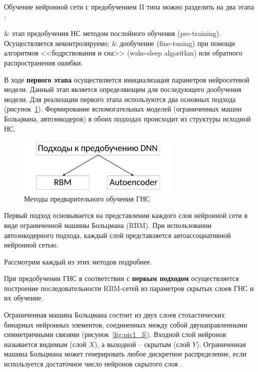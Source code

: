 Обучение нейронной сети с предобучением II типа можно разделить на два этапа \cite{n1, n2, n3, n4}: 
\begin{easylistNum}
	& этап предобучения НС методом послойного обучения (pre-training). Осуществляется неконтролируемо;
	& дообучение (fine-tuning) при помощи алгоритмов <<бодрствования и сна>> (wake-sleep algorithm) \cite{hinton1995} или обратного распространения ошибки.
\end{easylistNum}

В ходе \textbf{первого этапа} осуществляется инициализация параметров нейросетевой модели. Данный этап является определяющим для последующего дообучения модели.
Для реализации первого этапа используются два основных подхода (рисунок~\ref{fig:pic1_2}).
Формирование вспомогательных моделей (ограниченных машин Больцмана, автоэнкодеров) в обоих подходах происходит из структуры исходной НС. 

\begin{figure}[H]
  \centering
  \includegraphics[width=0.7\textwidth]{man-source/images/ch1/pic1-2.pdf}
  \caption{Методы предварительного обучения ГНС}
  \label{fig:pic1_2}
\end{figure}

Первый подход основывается на представлении каждого слоя нейронной сети в виде ограниченной машины Больцмана (RBM). При использовании автоэнкодерного подхода, каждый слой представляется автоассоциативной нейронной сетью.

Рассмотрим каждый из этих методов подробнее.

\def\slantfrac#1#2{ \hspace{3pt}\!^{#1}\!\!\hspace{1pt}/
  \hspace{2pt}\!\!_{#2}\!\hspace{3pt}
}

При предобучении ГНС в соответствии с \textbf{первым подходом} осуществляется построение последовательности RBM-сетей из параметров скрытых слоев ГНС и их обучение. 

Ограниченная машина Больцмана состоит из двух слоев стохастических бинарных нейронных элементов, соединенных между собой двунаправленными симметричными связями (рисунок~\ref{fig:pic1_3}). Входной слой нейронов называется видимым (слой $X$), а выходной -- скрытым (слой $Y$). Ограниченная машина Больцмана может генерировать любое дискретное распределение, если используется достаточное число нейронов скрытого слоя \cite{n5}.

